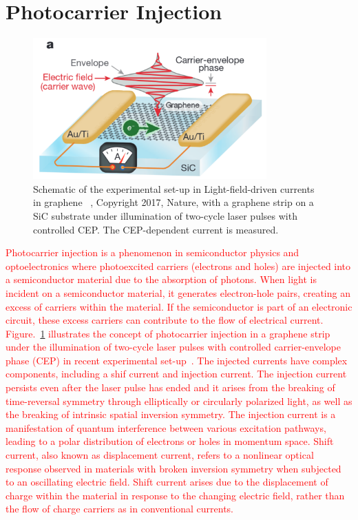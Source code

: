 \section{Photocarrier Injection \label{sec:intro_photocarrier}}
\begin{figure}[htpb]
	\centering
	\includegraphics[width=0.8\textwidth]{pic/photocarrier_intro.pdf}
	\caption[Lab coordinate system]{Schematic of the experimental set-up in Light-field-driven currents in graphene ~\cite{Higuchi2017}, Copyright 2017, Nature, with a graphene strip on a SiC substrate under illumination of two-cycle laser pulses with controlled CEP. The CEP-dependent current is measured.}
	\label{fig: photocarrier_intro}
\end{figure}
\textcolor{red}{Photocarrier injection is a phenomenon in semiconductor physics and optoelectronics where photoexcited carriers (electrons and holes) are injected into a semiconductor material due to the absorption of photons.  When light is incident on a semiconductor material, it generates electron-hole pairs, creating an excess of carriers within the material. If the semiconductor is part of an electronic circuit, these excess carriers can contribute to the flow of electrical current. Figure.~\ref{fig: photocarrier_intro} illustrates the concept of photocarrier injection in a graphene strip under the illumination of two-cycle laser pulses with controlled carrier-envelope phase (CEP) in recent experimental set-up~\cite{Higuchi2017}. The injected currents have complex components, including a shif current  and injection current. The injection current persists even after the laser pulse has ended and it arises from the breaking of time-reversal symmetry through elliptically or circularly polarized light, as well as the breaking of intrinsic spatial inversion symmetry. The injection current is a manifestation of quantum interference between various excitation pathways, leading to a polar distribution of electrons or holes in momentum space. Shift current, also known as displacement current, refers to a nonlinear optical response observed in materials with broken inversion symmetry when subjected to an oscillating electric field. Shift current arises due to the displacement of charge within the material in response to the changing electric field, rather than the flow of charge carriers as in conventional currents.}

